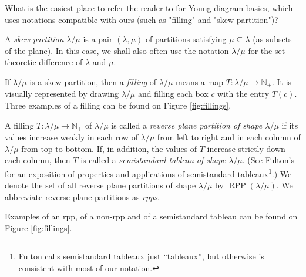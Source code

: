 \documentclass[numbers=enddot,12pt,final,onecolumn,notitlepage]{scrartcl}%
\theoremstyle{definition}
\newenvironment{todo}{}{}
\newcommand{\Nplus}{\mathbb{N}_{+}}
\def\lm{{\lambda/\mu}}
\begin{document}
\begin{todo}
What is the easiest place to refer the reader to for Young diagram basics,
which uses notations compatible with ours (such as "filling" and "skew
partition")?
\end{todo}

A \textit{skew partition} $\lambda/\mu$ is a pair $\left(\lambda, \mu\right)$ of partitions satisfying $\mu\subseteq\lambda$ (as subsets of the plane). In this case, we shall also often use the notation $\lambda/\mu$ for the set-theoretic difference of $\lambda$ and $\mu$.

 If $\lm$ is a skew partition, then a \textit{filling} of $\lm$ means a map $T:\lm\rightarrow\Nplus$. It is visually represented by drawing $\lm$ and filling each box $c$ with the entry $T(c)$. Three examples of a filling can be found on Figure \ref{fig:fillings}.
 

 A filling $T:\lm\rightarrow\Nplus$ of $\lm$ is called a \textit{reverse plane partition of shape $\lm$} if its values increase weakly in each row of $\lm$ from left to right and in each column of $\lm$ from top to bottom. If, in addition, the values of $T$ increase strictly down each column, then $T$ is called a \textit{semistandard tableau of shape $\lm$}. (See Fulton's \cite{Fulton97} for an exposition of properties and applications of semistandard tableaux\footnote{Fulton calls semistandard tableaux just ``tableaux'', but otherwise is consistent with most of our notation.}.) We denote the set of all reverse plane partitions of shape $\lm$ by $\operatorname{RPP}\left(  \lambda/\mu\right)$.  We abbreviate reverse plane partitions as \textit{rpps}. 
 
 Examples of an rpp, of a non-rpp and of a semistandard tableau can be found on Figure \ref{fig:fillings}.
 
\end{document}
